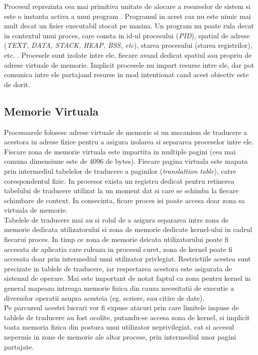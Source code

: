 Procesul reprezinta cea mai primitiva unitate de alocare a resurselor de sistem
si este o instanta activa a unui program \cite{processes}. Programul in acest
caz nu este nimic mai mult decat un fisier executabil stocat pe masina. Un
program nu poate rula decat in contextul unui proces, care consta in id-ul
procesului (\emph{PID}), spatiul de adrese (\emph{TEXT, DATA, STACK, HEAP, BSS,
etc}), starea procesului (starea registrilor), etc. \cite{exception_processes}.
Procesele sunt izolate intre ele, fiecare avand dedicat spatiul sau propriu de
adrese virtuale de memorie. Implicit procesele nu impart resurse intre ele, dar
pot comunica intre ele partajand resurse in mod intentionat cand acest obiectiv
este de dorit.


\subsection{Memorie Virtuala}

Procesoarele folosesc adrese virtuale de memorie si un mecanism de traducere a
acestora in adrese fizice pentru a asigura izolarea si separarea proceselor
intre ele. Fiecare zona de memorie virtuala este impartita in multiple pagini
(cea mai comuna dimensiune este de 4096 de bytes). Fiecare pagina virtuala este
mapata prin intermediul tabelelor de traducere a paginilor (\emph{translattion
table}), catre corespondentul fizic. In procesor exista un registru dedicat pentru 
retinerea tabelului de traducere utilizat la un moment dat si care se schimba la 
fiecare schimbare de context. In consecinta, ficare proces isi poate accesa doar 
zona sa virtuala de memorie. \\

Tabelele de traducere mai au si rolul de a asigura separarea intre zona de memorie
dedicata utilizatorului si zona de memorie dedicate kernel-ului in cadrul fiecarui
proces. In timp ce zona de memorie deicata utilizatorului poate fi accesata de 
aplicatia care ruleaza in procesul curet, zona de kernel poate fi accesata doar
prin intermediul unui utilizator privlegiat. Restrictiile acestea sunt precizate
in tablele de traducere, iar respectarea acestora este asigurata de sistemul de 
operare. Mai este important de notat faptul ca zona pentru kernel in general mapeaza
intreaga memorie fizica din cauza necesitatii de executie a diverselor operatii 
asupra acesteia (eg. scriere, sau citire de date).\\

Pe parcursul acestei lucrari vor fi expuse atacuri prin care limitele impuse de
tablele de traducere au fost ocolite, putandu-se accesa zona de kernel, si
implicit toata memoria fizica din postura unui utilizator neprivilegiat,
cat si accesul nepermis in zone de memorie ale altor procese, prin intermediul
unor pagini partajate.

